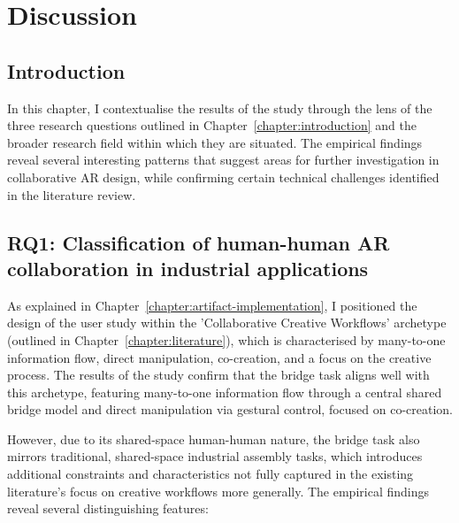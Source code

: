 \chapter{Discussion}\label{chapter:discussion}

\section{Introduction}
In this chapter, I contextualise the results of the study through the lens of the three research questions outlined in Chapter~\ref{chapter:introduction} and the broader research field within which they are situated. The empirical findings reveal several interesting patterns that suggest areas for further investigation in collaborative AR design, while confirming certain technical challenges identified in the literature review.

\section{RQ1: Classification of human-human AR collaboration in industrial applications}
As explained in Chapter~\ref{chapter:artifact-implementation}, I positioned the design of the user study within the 'Collaborative Creative Workflows' archetype (outlined in Chapter~\ref{chapter:literature}), which is characterised by many-to-one information flow, direct manipulation, co-creation, and a focus on the creative process. The results of the study confirm that the bridge task aligns well with this archetype, featuring many-to-one information flow through a central shared bridge model and direct manipulation via gestural control, focused on co-creation.

However, due to its shared-space human-human nature, the bridge task also mirrors traditional, shared-space industrial assembly tasks, which introduces additional constraints and characteristics not fully captured in the existing literature's focus on creative workflows more generally\cite{vidalBalea2020creating}. The empirical findings reveal several distinguishing features:

